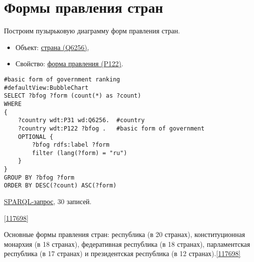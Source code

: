 \section{Формы правления стран}

Построим пузырьковую диаграмму форм правления стран.

\begin{itemize}
    \item Объект: \href{https://www.wikidata.org/wiki/Q6256}{страна (Q6256)},
    \item Свойство: \href{https://www.wikidata.org/wiki/Property:P122}{форма правления (P122)}.
\end{itemize}

\begin{lstlisting}[language=SPARQL]
#basic form of government ranking
#defaultView:BubbleChart
SELECT ?bfog ?form (count(*) as ?count)
WHERE 
{
    ?country wdt:P31 wd:Q6256.  #country
    ?country wdt:P122 ?bfog .   #basic form of government
    OPTIONAL {
		?bfog rdfs:label ?form
		filter (lang(?form) = "ru")
	}
}
GROUP BY ?bfog ?form
ORDER BY DESC(?count) ASC(?form)
\end{lstlisting}

\href{https://query.wikidata.org/#%23basic%20form%20of%20government%20ranking%0A%23defaultView%3ABubbleChart%0ASELECT%20%3Fbfog%20%3Fform%20%28count%28%2a%29%20as%20%3Fcount%29%0AWHERE%20%0A%7B%0A%20%20%20%20%3Fcountry%20wdt%3AP31%20wd%3AQ6256.%20%20%23country%0A%20%20%20%20%3Fcountry%20wdt%3AP122%20%3Fbfog%20.%20%20%20%23basic%20form%20of%20government%0A%20%20%20%20OPTIONAL%20%7B%0A%09%09%3Fbfog%20rdfs%3Alabel%20%3Fform%0A%09%09filter%20%28lang%28%3Fform%29%20%3D%20%22ru%22%29%0A%09%7D%0A%7D%0AGROUP%20BY%20%3Fbfog%20%3Fform%0AORDER%20BY%20DESC%28%3Fcount%29%20ASC%28%3Fform%29}{SPARQL-запрос}, 30 записей.

\ref{117698}

Основные формы правления стран: республика (в 20 странах), конституционная монархия (в 18 странах), федеративная республика (в 18 странах), парламентская республика (в 17 странах) и	президентская республика (в 12 странах).\ref{117698}
